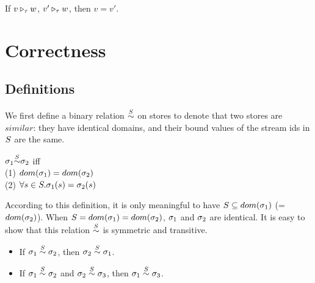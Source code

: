 \begin{comment}
\PT{
\AC{\ValRep {\lrange{v_1}{v_k}} {\tau} {\v}}
\UC{\ValRep {\Seqk{v}}{\tseq{\tau}}{(\v,\langle \F_1,..., \F_k, \T \rangle)}}
}\\[4ex]

\item \Jug{\ValRep{\lrange{v_1}{v_k}}{\tau}{\v}}
\PT{
\Axiom{\ValRep{\lrange{n_1}{n_k}}{\int}{\vrange{n_1}{n_k}}}
}
\PT{
\AC{\ValRep{v_i}{\tau}{\v}}
\UC{\ValRep{\lrange{v_1}{v_k}}{\tseq{\tau}}{}}
}

\end{comment}



\begin{lem}
	If $\ValRep{v}{\tau}{w}$, $\ValRep{v'}{\tau}{w}$,
	then $v=v'$.
\end{lem}



\section{Correctness}

\subsection{Definitions}
We first define a binary relation $\~\S$ on stores to denote that two stores are $similar$: they have identical domains, and their bound values of the stream ids in $\S$ are the same. 


\begin{defi}
	\label{def-sgm-sim}
	
	$\sgm_1 {\~{\S}} \sgm_2 $
	iff \\
	(1) $dom(\sgm_1) = dom(\sgm_2)$ \\
	(2) $\forall s \in \S.\sgm_1(s)= \sgm_2(s)$ \\
\end{defi}

According to this definition, it is only meaningful to have $\S  \subseteq dom(\sgm_1)$ (= $dom(\sgm_2)$).  
When $\S = dom(\sgm_1) = dom(\sgm_2)$, $\sgm_1$ and $\sgm_2$ are identical. 
It is easy to show that this relation $\overset{\S}{\sim}$ is symmetric and transitive.
\begin{itemize}
	\item If $\sgm_1 \~\S \sgm_2$, then $\sgm_2 \~\S \sgm_1$.
	\item If $\sgm_1 \~\S \sgm_2$ and $\sgm_2 \~\S \sgm_3$, then $\sgm_1 \~\S \sgm_3$.
\end{itemize}


